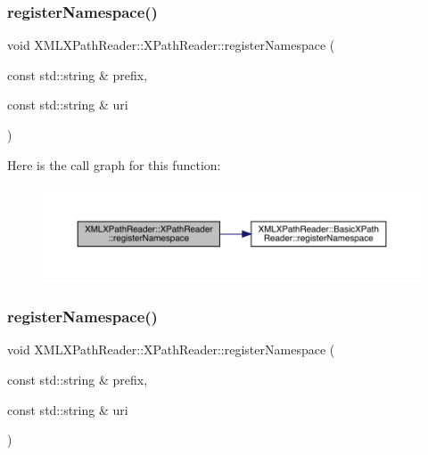 \subsubsection{\texorpdfstring{registerNamespace()}{registerNamespace()}\hspace{0.1cm}{\footnotesize\ttfamily [1/3]}}
{\footnotesize\ttfamily void X\+M\+L\+X\+Path\+Reader\+::\+X\+Path\+Reader\+::register\+Namespace (\begin{DoxyParamCaption}\item[{const std\+::string \&}]{prefix,  }\item[{const std\+::string \&}]{uri }\end{DoxyParamCaption})\hspace{0.3cm}{\ttfamily [inline]}}

Here is the call graph for this function\+:
\nopagebreak
\begin{figure}[H]
\begin{center}
\leavevmode
\includegraphics[width=350pt]{d3/d5a/classXMLXPathReader_1_1XPathReader_a4df21ae718977be11eb5669002522ebb_cgraph}
\end{center}
\end{figure}
\mbox{\label{classXMLXPathReader_1_1XPathReader_a4df21ae718977be11eb5669002522ebb}} 
\subsubsection{\texorpdfstring{registerNamespace()}{registerNamespace()}\hspace{0.1cm}{\footnotesize\ttfamily [2/3]}}
{\footnotesize\ttfamily void X\+M\+L\+X\+Path\+Reader\+::\+X\+Path\+Reader\+::register\+Namespace (\begin{DoxyParamCaption}\item[{const std\+::string \&}]{prefix,  }\item[{const std\+::string \&}]{uri }\end{DoxyParamCaption})\hspace{0.3cm}{\ttfamily [inline]}}

